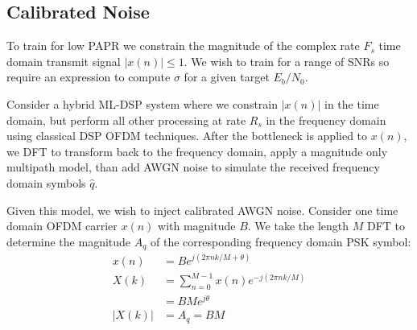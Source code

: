 \documentclass{article}
\begin{document}
\begin{figure}[h]
\begin{center}
\end{center}
\end{figure}

\subsection{Calibrated Noise}

To train for low PAPR we constrain the magnitude of the complex rate $F_s$ time domain transmit signal $|x(n)| \le 1$.  We wish to train for a range of SNRs so require an expression to compute $\sigma$ for a given target $E_b/N_0$.

Consider a hybrid ML-DSP system where we constrain $|x(n)|$ in the time domain, but perform all other processing at rate $R_s$ in the frequency domain using classical DSP OFDM techniques.  After the bottleneck is applied to $x(n)$, we DFT to transform back to the frequency domain, apply a magnitude only multipath model, than add AWGN noise to simulate the received frequency domain symbols $\hat{q}$.

Given this model, we wish to inject calibrated AWGN noise. Consider one time domain OFDM carrier $x(n)$ with magnitude $B$. We take the length $M$ DFT to determine the magnitude $A_q$ of the corresponding frequency domain PSK symbol:
\begin{equation}
\begin{split}
x(n) &= Be^{j(2 \pi n k/M + \theta)} \\
X(k) &= \sum_{n=0}^{M-1} x(n) e^{-j(2 \pi n k/M)} \\
     &= BMe^{j\theta} \\
|X(k)| &= A_q = BM
\end{split}
\end{equation}
\end{document}
